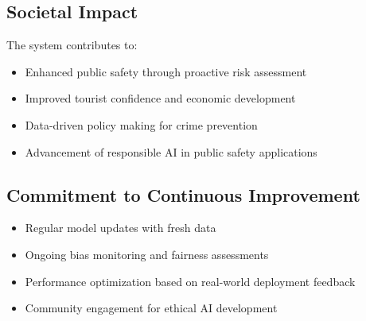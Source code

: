 \documentclass[11pt]{article}
\begin{document}
\subsection{Societal Impact}
The system contributes to:
\begin{itemize}[leftmargin=*]
\item Enhanced public safety through proactive risk assessment
\item Improved tourist confidence and economic development
\item Data-driven policy making for crime prevention
\item Advancement of responsible AI in public safety applications
\end{itemize}

\subsection{Commitment to Continuous Improvement}
\begin{itemize}[leftmargin=*]
\item Regular model updates with fresh data
\item Ongoing bias monitoring and fairness assessments
\item Performance optimization based on real-world deployment feedback
\item Community engagement for ethical AI development
\end{itemize}
\end{document}
